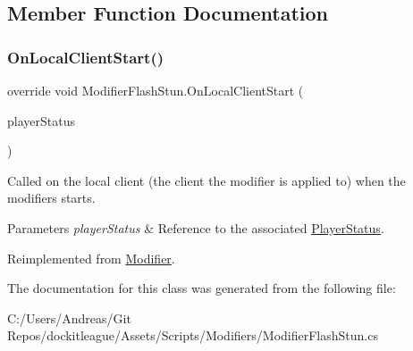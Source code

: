 \subsection{Member Function Documentation}
\hypertarget{class_modifier_flash_stun_a27c1f1560db77c6ea9f32655113392b7}{}\label{class_modifier_flash_stun_a27c1f1560db77c6ea9f32655113392b7} 
\subsubsection{\texorpdfstring{On\+Local\+Client\+Start()}{OnLocalClientStart()}}
{\footnotesize\ttfamily override void Modifier\+Flash\+Stun.\+On\+Local\+Client\+Start (\begin{DoxyParamCaption}\item[{\hyperlink{class_player_status}{Player\+Status}}]{player\+Status }\end{DoxyParamCaption})\hspace{0.3cm}{\ttfamily [virtual]}}



Called on the local client (the client the modifier is applied to) when the modifiers starts. 


\begin{DoxyParams}{Parameters}
{\em player\+Status} & Reference to the associated \hyperlink{class_player_status}{Player\+Status}.\\
\hline
\end{DoxyParams}


Reimplemented from \hyperlink{class_modifier_a5cce7ec6a5a595265a6bf5a6f7e40eb9}{Modifier}.



The documentation for this class was generated from the following file\+:\begin{DoxyCompactItemize}
\item 
C\+:/\+Users/\+Andreas/\+Git Repos/dockitleague/\+Assets/\+Scripts/\+Modifiers/Modifier\+Flash\+Stun.\+cs\end{DoxyCompactItemize}
